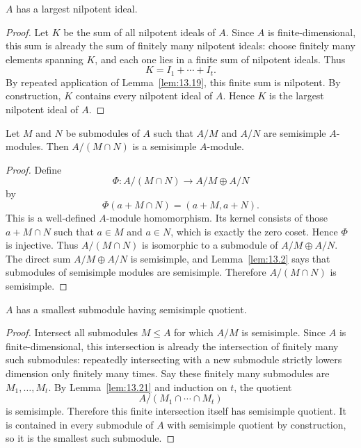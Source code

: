 \documentclass[../Odyssey_Project.tex]{subfiles}
\begin{document}
\begin{corollary}
\label{cor:13.20}
$A$ has a largest nilpotent ideal.
\end{corollary}
\begin{proof}
    Let $K$ be the sum of all nilpotent ideals of $A$. Since $A$ is finite-dimensional, this sum is already the sum of finitely many nilpotent ideals: choose finitely many elements spanning $K$, and each one lies in a finite sum of nilpotent ideals. Thus
    \[
        K = I_1 + \cdots + I_t.
    \]
    By repeated application of Lemma~\ref{lem:13.19}, this finite sum is nilpotent. By construction, $K$ contains every nilpotent ideal of $A$. Hence $K$ is the largest nilpotent ideal of $A$.
\end{proof}

\begin{lemma}
\label{lem:13.21}
Let $M$ and $N$ be submodules of $A$ such that $A/M$ and $A/N$ are semisimple $A$-modules. Then $A/(M \cap N)$ is a semisimple $A$-module.
\end{lemma}
\begin{proof}
    Define
    \[
        \Phi \colon A/(M \cap N) \to A/M \oplus A/N
    \]
    by
    \[
        \Phi(a + M \cap N) = (a+M, a+N).
    \]
    This is a well-defined $A$-module homomorphism. Its kernel consists of those $a + M \cap N$ such that $a \in M$ and $a \in N$, which is exactly the zero coset. Hence $\Phi$ is injective. Thus $A/(M \cap N)$ is isomorphic to a submodule of $A/M \oplus A/N$. The direct sum $A/M \oplus A/N$ is semisimple, and Lemma~\ref{lem:13.2} says that submodules of semisimple modules are semisimple. Therefore $A/(M \cap N)$ is semisimple.
\end{proof}

\begin{corollary}
\label{cor:13.22}
$A$ has a smallest submodule having semisimple quotient.
\end{corollary}
\begin{proof}
    Intersect all submodules $M \leq A$ for which $A/M$ is semisimple. Since $A$ is finite-dimensional, this intersection is already the intersection of finitely many such submodules: repeatedly intersecting with a new submodule strictly lowers dimension only finitely many times. Say these finitely many submodules are $M_1,\ldots,M_t$. By Lemma~\ref{lem:13.21} and induction on $t$, the quotient
    \[
        A/(M_1 \cap \cdots \cap M_t)
    \]
    is semisimple. Therefore this finite intersection itself has semisimple quotient. It is contained in every submodule of $A$ with semisimple quotient by construction, so it is the smallest such submodule.
\end{proof}
\end{document}
